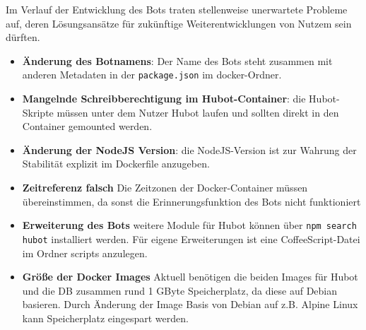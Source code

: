Im Verlauf der Entwicklung des Bots traten stellenweise unerwartete Probleme auf, deren Lösungsansätze für zukünftige Weiterentwicklungen von Nutzem sein dürften.
\begin{itemize}
    \item \textbf{Änderung des Botnamens}: Der Name des Bots steht zusammen mit anderen Metadaten in der \texttt{package.json} im docker-Ordner.
    \item \textbf{Mangelnde Schreibberechtigung im Hubot-Container}: die Hubot-Skripte müssen unter dem Nutzer Hubot laufen und sollten direkt in den Container gemounted werden.
    \item \textbf{Änderung der NodeJS Version}: die NodeJS-Version ist zur Wahrung der Stabilität explizit im Dockerfile anzugeben.
    \item \textbf{Zeitreferenz falsch} Die Zeitzonen der Docker-Container müssen übereinstimmen, da sonst die Erinnerungsfunktion des Bots nicht funktioniert
    \item \textbf{Erweiterung des Bots} weitere Module für Hubot können über \texttt{npm search hubot} installiert werden. Für eigene Erweiterungen ist eine CoffeeScript-Datei im Ordner scripts anzulegen.
    \item \textbf{Größe der Docker Images} Aktuell benötigen die beiden Images für Hubot und die DB zusammen rund 1 GByte Speicherplatz, da diese auf Debian basieren. Durch Änderung der Image Basis von Debian auf z.B. Alpine Linux kann Speicherplatz eingespart werden.
\end{itemize}
